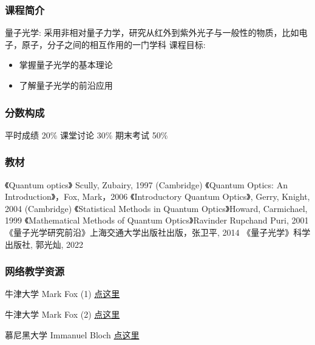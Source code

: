 \begin{frame}
    \frametitle{课程简介}
    \begin{enumerate}
        \Item 量子光学: 采用非相对量子力学，研究从红外到紫外光子与一般性的物质，比如电子，原子，分子之间的相互作用的一门学科
        \pause
        \Item 课程目标:       
        \begin{itemize}
          \item 掌握量子光学的基本理论
          \item 了解量子光学的前沿应用
      \end{itemize}
    \end{enumerate}
\end{frame}

\begin{frame} 
  \frametitle{分数构成}
      \begin{enumerate}
          \Item 平时成绩 20\%
          \Item 课堂讨论 30\%
          \Item 期末考试 50\%
      \end{enumerate}
\end{frame}

\begin{frame}
    \frametitle{教材}
      \begin{itemize}
          \Item 《Quantum optics》 Scully, Zubairy, 1997 (Cambridge)        
          \Item 《Quantum Optics: An Introduction》，Fox, Mark，2006
          \Item 《Introductory Quantum Optics》, Gerry, Knight, 2004 (Cambridge)
          \pause
          \Item 《Statistical Methods in Quantum Optics》Howard, Carmichael, 1999 
          \Item 《Mathematical Methods of Quantum Optics》Ravinder Rupchand Puri, 2001
          \pause
          \Item 《量子光学研究前沿》上海交通大学出版社出版，张卫平, 2014
          \Item 《量子光学》科学出版社, 郭光灿, 2022
      \end{itemize}
\end{frame}

\begin{frame} 
\frametitle{网络教学资源}

牛津大学 Mark Fox (1)
\href{https://www.bilibili.com/video/BV1PK4y1E79Z?t=3.2}{点这里}\\ {\vspace*{2.3em}}

牛津大学 Mark Fox (2)
\href{https://www.bilibili.com/video/BV1mb4y1j7mu/?spm_id_from=autoNext} {点这里} \\ {\vspace*{2.3em}}

慕尼黑大学 Immanuel Bloch
\href{https://www.bilibili.com/video/BV1Ky4y1W7C7?p=1} {点这里}
     
\end{frame}

